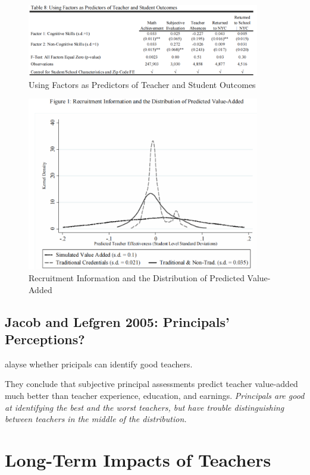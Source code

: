             \begin{figure}[H]
                \centering
                \includegraphics[width=4in]{images/ch9/9 rockoff 4.png}
                \caption{Using Factors as Predictors of Teacher and Student Outcomes}
            \end{figure}
            \begin{figure}[H]
                \centering
                \includegraphics[width=4in]{images/ch9/9 rockoff 5.png}
                \caption{Recruitment Information and the Distribution of Predicted Value-Added}
            \end{figure}

    \subsection{Jacob and Lefgren 2005: Principals' Perceptions?}

        \cite{jacob_principals_2005} alayse whether pricipals can identify good teachers.

        They conclude that subjective principal assessments predict teacher value-added much better than teacher experience, education, and earnings. \emph{Principals are good at identifying the best and the worst teachers, but have trouble distinguishing between teachers in the middle of the distribution.}

\section{Long-Term Impacts of Teachers}

